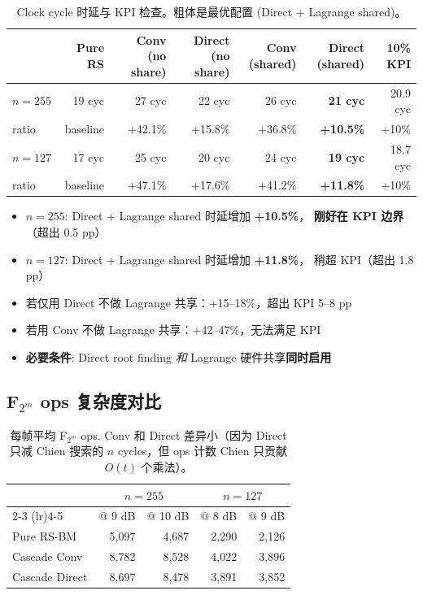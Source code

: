 \documentclass[11pt,a4paper]{article}
\begin{document}
\begin{table}[!ht]
\centering
\begin{tabularx}{\textwidth}{lrrrrrr}
\toprule
& \textbf{Pure RS} & \textbf{Conv (no share)} & \textbf{Direct (no share)} &
  \textbf{Conv (shared)} & \textbf{Direct (shared)} & \textbf{10\% KPI} \\
\midrule
$n=255$          & 19 cyc & 27 cyc & 22 cyc & 26 cyc & \textbf{21 cyc} & 20.9 cyc \\
\quad ratio     & baseline & +42.1\% & +15.8\% & +36.8\% & \textbf{+10.5\%} & +10\% \\
$n=127$          & 17 cyc & 25 cyc & 20 cyc & 24 cyc & \textbf{19 cyc} & 18.7 cyc \\
\quad ratio     & baseline & +47.1\% & +17.6\% & +41.2\% & \textbf{+11.8\%} & +10\% \\
\bottomrule
\end{tabularx}
\caption{Clock cycle 时延与 KPI 检查。粗体是最优配置 (Direct + Lagrange shared)。}
\end{table}

\begin{resultbox}[title=\textbf{时延 KPI 结果}]
\begin{itemize}[leftmargin=1.5em, itemsep=1pt, topsep=2pt]
\item \textbf{$n=255$}: Direct + Lagrange shared 时延增加 \textbf{+10.5\%}，
      \textbf{刚好在 KPI 边界}（超出 0.5 pp）
\item \textbf{$n=127$}: Direct + Lagrange shared 时延增加 \textbf{+11.8\%}，
      稍超 KPI（超出 1.8 pp）
\item 若仅用 Direct 不做 Lagrange 共享：+15--18\%，超出 KPI 5--8 pp
\item 若用 Conv 不做 Lagrange 共享：+42--47\%，无法满足 KPI
\item \textbf{必要条件}: Direct root finding \emph{和} Lagrange 硬件共享\textbf{同时启用}
\end{itemize}
\end{resultbox}

\subsection{F$_{2^m}$ ops 复杂度对比}

\begin{table}[!ht]
\centering
\begin{tabular}{lrrrr}
\toprule
& \multicolumn{2}{c}{\textbf{$n=255$}} & \multicolumn{2}{c}{\textbf{$n=127$}} \\
\cmidrule(lr){2-3} \cmidrule(lr){4-5}
& @ 9 dB & @ 10 dB & @ 8 dB & @ 9 dB \\
\midrule
Pure RS-BM       & 5,097 & 4,687 & 2,290 & 2,126 \\
Cascade Conv     & 8,782 & 8,528 & 4,022 & 3,896 \\
Cascade Direct   & 8,697 & 8,478 & 3,891 & 3,852 \\
\bottomrule
\end{tabular}
\caption{每帧平均 F$_{2^m}$ ops. Conv 和 Direct 差异小（因为 Direct 只减 Chien 搜索的 $n$ cycles，但 ops 计数 Chien 只贡献 $O(t)$ 个乘法）。}
\end{table}
\end{document}
